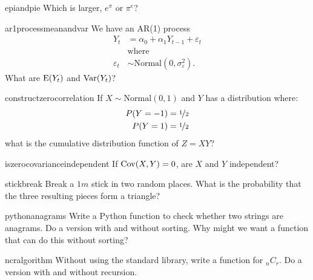 \documentclass[a4paper]{article}
\begin{document}
\begin{question}{epiandpie}
Which is larger,
$e^\pi$
or
$\pi^e$?
\end{question}



\begin{question}{ar1processmeanandvar}
We have an AR(1) process
\begin{align*}
  Y_t &= \alpha_0 + \alpha_1 Y_{t-1} + \varepsilon_{t} \\
   & \text{where} \\
   \varepsilon_{t} &\sim \text{Normal}(0,\sigma_{\varepsilon}^2)
   \text{.}
\end{align*}
What are
$\operatorname{\mathrm{E}}(Y_t)$
and
$\operatorname{\mathrm{Var}}(Y_t)$?
\end{question}


\begin{question}{constructzerocorrelation}
If $X \sim \text{Normal}(0, 1)$ and $Y$ has a distribution where:
\begin{align*}
 P(Y=-1) &=  \nicefrac{1}{2} \\
 P(Y=1)  &=  \nicefrac{1}{2}
\end{align*}
what is the cumulative distribution function of $Z=XY$?
\end{question}


\begin{question}{iszerocovarianceindependent}
If $\operatorname{\mathrm{Cov}}(X,Y)=0$, are $X$ and $Y$ independent?
\end{question}


\begin{question}{stickbreak}
Break a  $1m$ stick in two random places.
What is the probability that the three resulting pieces form a triangle?
\end{question}


\begin{question}{pythonanagrams}
Write a Python function to check whether two strings are anagrams.
Do a version with and without sorting.
Why might we want a function that can do this without sorting?
\end{question}


\begin{question}{ncralgorithm}
Without using the standard library, write a function for ${}_nC_{r}$.
Do a version with and without recursion.
\end{question}
\end{document}
